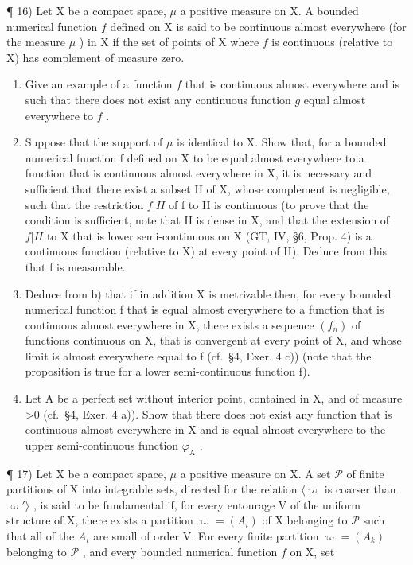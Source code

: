 ¶ 16) Let X be a compact space, \(\mu\) a positive measure on X. A bounded numerical function \(f\) defined on X is said to be continuous almost everywhere (for the measure \(\mu\) ) in X if the set of points of X where \(f\) is continuous (relative to X) has complement of measure zero.

\begin{enumerate}
\def\labelenumi{\alph{enumi})}
\item
  Give an example of a function \(f\) that is continuous almost everywhere and is such that there does not exist any continuous function \(g\) equal almost everywhere to \(f\) .
\item
  Suppose that the support of \(\mu\) is identical to X. Show that, for a bounded numerical function f defined on X to be equal almost everywhere to a function that is continuous almost everywhere in X, it is necessary and sufficient that there exist a subset H of X, whose complement is negligible, such that the restriction \(f|H\) of f to H is continuous (to prove that the condition is sufficient, note that H is dense in X, and that the extension of \(f|H\) to X that is lower semi-continuous on X (GT, IV, §6, Prop. 4) is a continuous function (relative to X) at every point of H). Deduce from this that f is measurable.
\item
  Deduce from b) that if in addition X is metrizable then, for every bounded numerical function f that is equal almost everywhere to a function that is continuous almost everywhere in X, there exists a sequence \((f_{n})\) of functions continuous on X, that is convergent at every point of X, and whose limit is almost everywhere equal to f (cf.~§4, Exer. 4 c)) (note that the proposition is true for a lower semi-continuous function f).
\item
  Let A be a perfect set without interior point, contained in X, and of measure \textgreater0 (cf.~§4, Exer. 4 a)). Show that there does not exist any function that is continuous almost everywhere in X and is equal almost everywhere to the upper semi-continuous function \(\varphi_{\mathrm{A}}\) .
\end{enumerate}

¶ 17) Let X be a compact space, \(\mu\) a positive measure on X. A set \(\mathcal{P}\) of finite partitions of X into integrable sets, directed for the relation \(\langle\varpi\) is coarser than \(\varpi'\rangle\) , is said to be fundamental if, for every entourage V of the uniform structure of X, there exists a partition \(\varpi = (A_i)\) of X belonging to \(\mathcal{P}\) such that all of the \(A_i\) are small of order V. For every finite partition \(\varpi = (A_k)\) belonging to \(\mathcal{P}\) , and every bounded numerical function \(f\) on X, set

